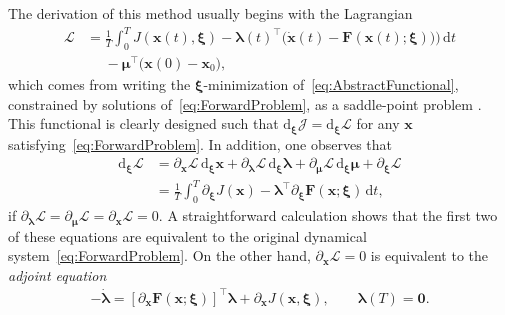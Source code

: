 \documentclass[ reprint,
nofootinbib,
 amsmath,amssymb,
 aps,
]{revtex4-2}
\begin{document}
The derivation of this method usually begins with the Lagrangian
\begin{equation}
\begin{aligned}
	\mathcal{L}
		&=
	\frac{1}{T}
	\int_{0}^{T}
	J(\mathbf{x}(t),\bm{\xi}) - \bm{\lambda}(t)^\top\big(\dot{\mathbf{x}}(t) - \mathbf{F}(\mathbf{x}(t);{\bm{\xi}}))\big)
	\,
	\mathrm{d}t
	\\
	&\phantom{=}-
		\bm{\mu}^\top \big(\mathbf{x}(0) - \mathbf{x}_0\big)
	,
\end{aligned}
\end{equation}
which comes from writing the $\bm{\xi}$-minimization of~\cref{eq:AbstractFunctional}, constrained by solutions of~\cref{eq:ForwardProblem}, as a saddle-point problem \cite{ekeland1999convex}.
This functional is clearly designed such that $\mathrm{d}_{\bm{\xi}} \mathcal{J} = \mathrm{d}_{\bm{\xi}} \mathcal{L}$ for any $\mathbf{x}$ satisfying~\cref{eq:ForwardProblem}.
In addition, one observes that
\begin{align}
			\mathrm{d}_{\bm{\xi}} \mathcal{L}
	&=
	\partial_{\mathbf{x}} \mathcal{L}\, \mathrm{d}_{\bm{\xi}}\mathbf{x}
	+
	\partial_{\bm{\lambda}} \mathcal{L}\, \mathrm{d}_{\bm{\xi}}\bm{\lambda}
	+
	\partial_{\bm{\mu}} \mathcal{L}\, \mathrm{d}_{\bm{\xi}}\bm{\mu}
	+
	\partial_{\bm{\xi}} \mathcal{L}
	\\
	&=
	\frac{1}{T}
	\int_{0}^{T}
	\partial_{\bm{\xi}} J(\mathbf{x})
	-
	\bm{\lambda}^\top \partial_{\bm{\xi}} \mathbf{F}(\mathbf{x};{\bm{\xi}})
	\,
	\mathrm{d}t
	,
\end{align}
if $\partial_{\bm{\lambda}} \mathcal{L} = \partial_{\bm{\mu}} \mathcal{L} = \partial_{\mathbf{x}} \mathcal{L} = 0$.
A straight\-forward calculation shows that the first two of these equations are equivalent to the original dynamical system~\cref{eq:ForwardProblem}.
On the other hand, $\partial_{\mathbf{x}} \mathcal{L} = 0$ is equivalent to the \emph{adjoint equation}
\begin{align}
\label{eq:BackwardProblem}
	-\dot{\bm{\lambda}}
	=
	[\partial_\mathbf{x}\mathbf{F}(\mathbf{x};{\bm{\xi}})]^\top\bm{\lambda}
	+
	\partial_\mathbf{x} J(\mathbf{x},{\bm{\xi}})
	,
	\qquad
	\bm{\lambda}(T) = \bm{0}
	.
\end{align}
\end{document}
